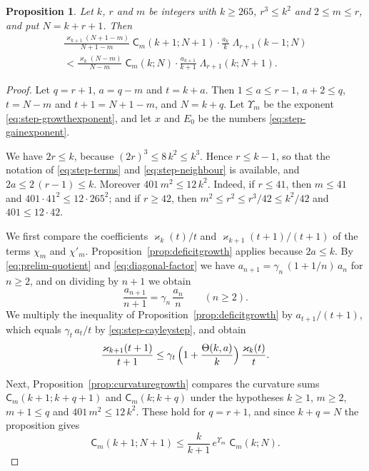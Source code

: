 \documentclass{amsart}
\newtheorem{proposition}[theorem]{Proposition}
\theoremstyle{definition}
\theoremstyle{remark}
\numberwithin{equation}{section}
\begin{document}
\begin{proposition}\label{prop:oneterm}
Let $k$, $r$ and $m$ be integers with $k\ge265$, $r^3\le k^2$ and
$2\le m\le r$, and put $N=k+r+1$. Then
\begin{multline*}
\frac{\varkappa_{k+1}(N+1-m)}{N+1-m}\;\mathsf C_m(k+1;N+1)\cdot
\frac{a_k}{k}\;\Lambda_{r+1}(k-1;N)\\
<\frac{\varkappa_k(N-m)}{N-m}\;\mathsf C_m(k;N)\cdot
\frac{a_{k+1}}{k+1}\;\Lambda_{r+1}(k;N+1).
\end{multline*}
\end{proposition}

\begin{proof}
Let $q=r+1$, $a=q-m$ and $t=k+a$. Then $1\le a\le r-1$, $a+2\le q$,
$t=N-m$ and $t+1=N+1-m$, and $N=k+q$. Let $\Upsilon_m$ be the exponent
\eqref{eq:step-growthexponent}, and let $x$ and $E_0$ be the numbers
\eqref{eq:step-gainexponent}.

We have $2r\le k$, because $(2r)^3\le8\,k^2\le k^3$. Hence
$r\le k-1$, so that the notation of \eqref{eq:step-terms} and
\eqref{eq:step-neighbour} is available, and $2a\le2\,(r-1)\le k$. Moreover
$401\,m^2\le12\,k^2$. Indeed, if $r\le41$, then $m\le41$ and
$401\cdot41^2\le12\cdot265^2$; and if $r\ge42$, then
$m^2\le r^2\le r^3/42\le k^2/42$ and $401\le12\cdot42$.

We first compare the coefficients $\varkappa_k(t)/t$ and
$\varkappa_{k+1}(t+1)/(t+1)$ of the terms $\chi_m$ and $\chi'_m$.
Proposition~\ref{prop:deficitgrowth} applies because
$2a\le k$. By \eqref{eq:prelim-quotient} and \eqref{eq:diagonal-factor} we
have $a_{n+1}=\gamma_n\,(1+1/n)\,a_n$ for $n\ge2$, and on dividing by $n+1$
we obtain
\begin{equation}\label{eq:step-cayleystep}
\frac{a_{n+1}}{n+1}=\gamma_n\,\frac{a_n}{n}\qquad(n\ge2).
\end{equation}
We multiply the inequality of Proposition~\ref{prop:deficitgrowth} by
$a_{t+1}/(t+1)$, which equals $\gamma_t\,a_t/t$ by
\eqref{eq:step-cayleystep}, and obtain
\begin{equation}\label{eq:step-coefficient}
\frac{\varkappa_{k+1}(t+1)}{t+1}\le\gamma_t\,
\Bigl(1+\frac{\Theta(k,a)}{k}\Bigr)\,\frac{\varkappa_k(t)}{t}.
\end{equation}

Next, Proposition~\ref{prop:curvaturegrowth} compares
the curvature sums $\mathsf C_m(k+1;k+q+1)$ and $\mathsf C_m(k;k+q)$ under
the hypotheses $k\ge1$, $m\ge2$, $m+1\le q$ and $401\,m^2\le12\,k^2$. These
hold for $q=r+1$, and since $k+q=N$ the proposition gives
\begin{equation}\label{eq:step-curvature}
\mathsf C_m(k+1;N+1)\le\frac{k}{k+1}\,e^{\Upsilon_m}\;\mathsf C_m(k;N).
\end{equation}


\end{proof}
\end{document}
